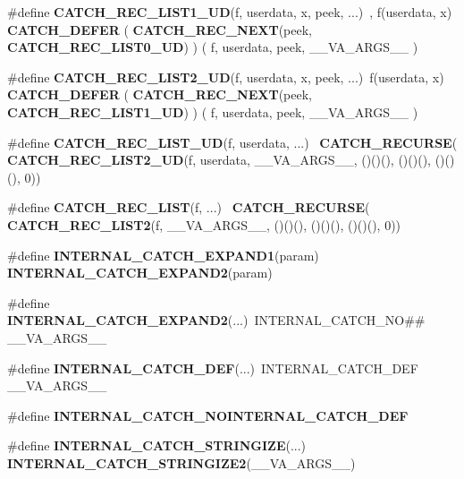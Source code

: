 \begin{DoxyCompactItemize}
\item 
\#define \textbf{ C\+A\+T\+C\+H\+\_\+\+R\+E\+C\+\_\+\+L\+I\+S\+T1\+\_\+\+UD}(f,  userdata,  x,  peek, ...)~, f(userdata, x) \textbf{ C\+A\+T\+C\+H\+\_\+\+D\+E\+F\+ER} ( \textbf{ C\+A\+T\+C\+H\+\_\+\+R\+E\+C\+\_\+\+N\+E\+XT}(peek, \textbf{ C\+A\+T\+C\+H\+\_\+\+R\+E\+C\+\_\+\+L\+I\+S\+T0\+\_\+\+UD}) ) ( f, userdata, peek, \+\_\+\+\_\+\+V\+A\+\_\+\+A\+R\+G\+S\+\_\+\+\_\+ )
\item 
\#define \textbf{ C\+A\+T\+C\+H\+\_\+\+R\+E\+C\+\_\+\+L\+I\+S\+T2\+\_\+\+UD}(f,  userdata,  x,  peek, ...)~f(userdata, x) \textbf{ C\+A\+T\+C\+H\+\_\+\+D\+E\+F\+ER} ( \textbf{ C\+A\+T\+C\+H\+\_\+\+R\+E\+C\+\_\+\+N\+E\+XT}(peek, \textbf{ C\+A\+T\+C\+H\+\_\+\+R\+E\+C\+\_\+\+L\+I\+S\+T1\+\_\+\+UD}) ) ( f, userdata, peek, \+\_\+\+\_\+\+V\+A\+\_\+\+A\+R\+G\+S\+\_\+\+\_\+ )
\item 
\#define \textbf{ C\+A\+T\+C\+H\+\_\+\+R\+E\+C\+\_\+\+L\+I\+S\+T\+\_\+\+UD}(f,  userdata, ...)~\textbf{ C\+A\+T\+C\+H\+\_\+\+R\+E\+C\+U\+R\+SE}(\textbf{ C\+A\+T\+C\+H\+\_\+\+R\+E\+C\+\_\+\+L\+I\+S\+T2\+\_\+\+UD}(f, userdata, \+\_\+\+\_\+\+V\+A\+\_\+\+A\+R\+G\+S\+\_\+\+\_\+, ()()(), ()()(), ()()(), 0))
\item 
\#define \textbf{ C\+A\+T\+C\+H\+\_\+\+R\+E\+C\+\_\+\+L\+I\+ST}(f, ...)~\textbf{ C\+A\+T\+C\+H\+\_\+\+R\+E\+C\+U\+R\+SE}(\textbf{ C\+A\+T\+C\+H\+\_\+\+R\+E\+C\+\_\+\+L\+I\+S\+T2}(f, \+\_\+\+\_\+\+V\+A\+\_\+\+A\+R\+G\+S\+\_\+\+\_\+, ()()(), ()()(), ()()(), 0))
\item 
\#define \textbf{ I\+N\+T\+E\+R\+N\+A\+L\+\_\+\+C\+A\+T\+C\+H\+\_\+\+E\+X\+P\+A\+N\+D1}(param)~\textbf{ I\+N\+T\+E\+R\+N\+A\+L\+\_\+\+C\+A\+T\+C\+H\+\_\+\+E\+X\+P\+A\+N\+D2}(param)
\item 
\#define \textbf{ I\+N\+T\+E\+R\+N\+A\+L\+\_\+\+C\+A\+T\+C\+H\+\_\+\+E\+X\+P\+A\+N\+D2}(...)~I\+N\+T\+E\+R\+N\+A\+L\+\_\+\+C\+A\+T\+C\+H\+\_\+\+NO\#\# \+\_\+\+\_\+\+V\+A\+\_\+\+A\+R\+G\+S\+\_\+\+\_\+
\item 
\#define \textbf{ I\+N\+T\+E\+R\+N\+A\+L\+\_\+\+C\+A\+T\+C\+H\+\_\+\+D\+EF}(...)~I\+N\+T\+E\+R\+N\+A\+L\+\_\+\+C\+A\+T\+C\+H\+\_\+\+D\+EF \+\_\+\+\_\+\+V\+A\+\_\+\+A\+R\+G\+S\+\_\+\+\_\+
\item 
\#define \textbf{ I\+N\+T\+E\+R\+N\+A\+L\+\_\+\+C\+A\+T\+C\+H\+\_\+\+N\+O\+I\+N\+T\+E\+R\+N\+A\+L\+\_\+\+C\+A\+T\+C\+H\+\_\+\+D\+EF}
\item 
\#define \textbf{ I\+N\+T\+E\+R\+N\+A\+L\+\_\+\+C\+A\+T\+C\+H\+\_\+\+S\+T\+R\+I\+N\+G\+I\+ZE}(...)~\textbf{ I\+N\+T\+E\+R\+N\+A\+L\+\_\+\+C\+A\+T\+C\+H\+\_\+\+S\+T\+R\+I\+N\+G\+I\+Z\+E2}(\+\_\+\+\_\+\+V\+A\+\_\+\+A\+R\+G\+S\+\_\+\+\_\+)

\end{DoxyCompactItemize}
